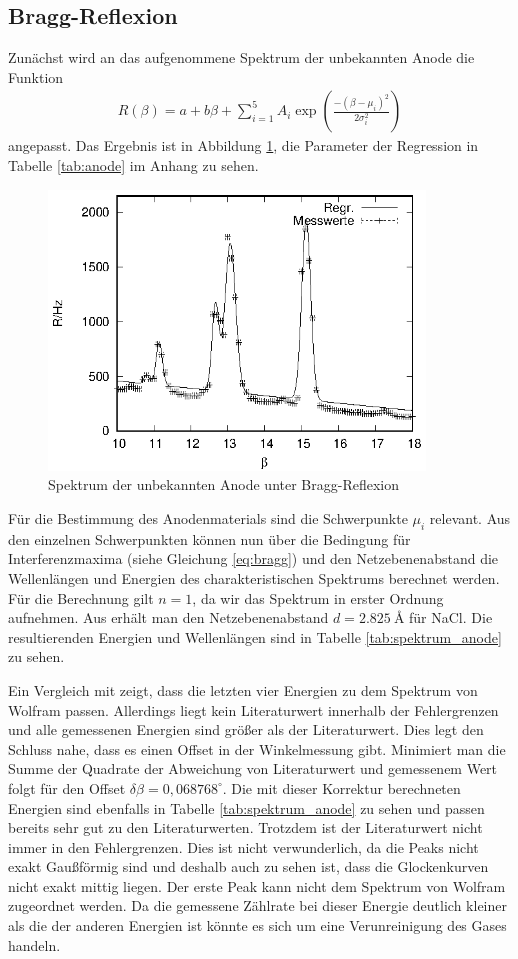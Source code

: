 \subsection{Bragg-Reflexion}
Zunächst wird an das aufgenommene Spektrum der unbekannten Anode die Funktion
\begin{align*}
  R(\beta)=a+b\beta+\sum_{i=1}^5 A_i\exp \left(  \frac{-(\beta-\mu_i)^2}{2\sigma_i^2}\right)
\end{align*}
angepasst. Das Ergebnis ist in Abbildung \ref{fig:anode}, die Parameter der Regression in Tabelle \ref{tab:anode} im Anhang zu sehen. 

\begin{figure}[h]
  \centering
  \includegraphics[width=10cm]{data/Bragg/anode.eps}
  \caption{Spektrum der unbekannten Anode unter Bragg-Reflexion}
  \label{fig:anode}
\end{figure}

Für die Bestimmung des Anodenmaterials sind die Schwerpunkte $\mu_i$ relevant. Aus den einzelnen Schwerpunkten können nun über die Bedingung für Interferenzmaxima (siehe Gleichung \ref{eq:bragg}) und den Netzebenenabstand die Wellenlängen und Energien des charakteristischen Spektrums berechnet werden. Für die Berechnung gilt $n=1$, da wir das Spektrum in erster Ordnung aufnehmen. Aus \cite{d_nacl} erhält man den Netzebenenabstand $d=\SI{2,825}{\angstrom}$ für NaCl. Die resultierenden Energien und Wellenlängen sind in Tabelle \ref{tab:spektrum_anode} zu sehen.


Ein Vergleich mit \cite{booklet} zeigt, dass die letzten vier Energien zu dem Spektrum von Wolfram passen. Allerdings liegt kein Literaturwert innerhalb der Fehlergrenzen und alle gemessenen Energien sind größer als der Literaturwert. Dies legt den Schluss nahe, dass es einen Offset in der Winkelmessung gibt. Minimiert man die Summe der Quadrate der Abweichung von Literaturwert und gemessenem Wert folgt für den Offset $\delta \beta=0,068768^\circ$. Die mit dieser Korrektur berechneten Energien sind ebenfalls in Tabelle \ref{tab:spektrum_anode} zu sehen und passen bereits sehr gut zu den Literaturwerten. Trotzdem ist der Literaturwert nicht immer in den Fehlergrenzen. Dies ist nicht verwunderlich, da die Peaks nicht exakt Gaußförmig sind und deshalb auch zu sehen ist, dass die Glockenkurven nicht exakt mittig liegen. Der erste Peak kann nicht dem Spektrum von Wolfram zugeordnet werden. Da die gemessene Zählrate bei dieser Energie deutlich kleiner als die der anderen Energien ist könnte es sich um eine Verunreinigung des Gases handeln. 

